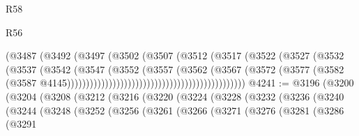 \begin{lexlean}{R58}
\begin{lexlean}{R56}
\begin{coremodule}
{{{{{{{{{{{{{{{{{{{{{{{{{{{{{{{{{{{{{{{{{{{{{{{{{{{{{{{{{{{{{{{{{{{{{{{{{{{{{{{{{{{{{{{{{{{{{{{{{{{{{{{{{{{{{{{{{{{{{{{{{{{{{{{{{{{{{{{{{{{{{{{{{{{{{{{{{{{{{{{{{{{{{{{{{{{{{{{{{{{{{{{{{{{{{{{{{{{{{{{{{{{{{{{{{{{                                                        (@3487
                                                          (@3492
                                                            (@3497
                                                              (@3502
                                                                (@3507
                                                                  (@3512
                                                                    (@3517
                                                                      (@3522
                                                                        (@3527
                                                                          (@3532
                                                                            (@3537
                                                                              (@3542
                                                                                (@3547
                                                                                  (@3552
                                                                                    (@3557
                                                                                      (@3562
                                                                                        (@3567
                                                                                          (@3572
                                                                                            (@3577
                                                                                              (@3582
                                                                                                (@3587
                                                                                                  @4145)))))))))))))))))))))))))))))))))))))))))))))))
@4241 := @3196
    (@3200
      (@3204
        (@3208
          (@3212
            (@3216
              (@3220
                (@3224
                  (@3228
                    (@3232
                      (@3236
                        (@3240
                          (@3244
                            (@3248
                              (@3252
                                (@3256
                                  (@3261
                                    (@3266
                                      (@3271
                                        (@3276
                                          (@3281
                                            (@3286
                                              (@3291
}}}}}}}}}}}}}}}}}}}}}}}}}}}}}}}}}}}}}}}}}}}}}}}}}}}}}}}}}}}}}}}}}}}}}}}}}}}}}}}}}}}}}}}}}}}}}}}}}}}}}}}}}}}}}}}}}}}}}}}}}}}}}}}}}}}}}}}}}}}}}}}}}}}}}}}}}}}}}}}}}}}}}}}}}}}}}}}}}}}}}}}}}}}}}}}}}}}}}}}}}}}}}}}}}}}
\end{coremodule}
\end{lexlean}
\end{lexlean}
